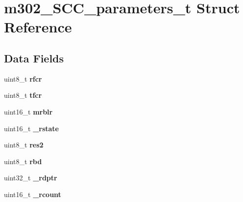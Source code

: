 \hypertarget{structm302__SCC__parameters__t}{}\section{m302\+\_\+\+S\+C\+C\+\_\+parameters\+\_\+t Struct Reference}
\label{structm302__SCC__parameters__t}
\subsection*{Data Fields}
\begin{DoxyCompactItemize}
\item 
\mbox{\label{structm302__SCC__parameters__t_a1f1cbb08cc304bc826678beb029a76e1}} 
uint8\+\_\+t {\bfseries rfcr}
\item 
\mbox{\label{structm302__SCC__parameters__t_a48c538c4596df61fd03851bae233ec4d}} 
uint8\+\_\+t {\bfseries tfcr}
\item 
\mbox{\label{structm302__SCC__parameters__t_a70bd6b673dd52012e63c11037865db8b}} 
uint16\+\_\+t {\bfseries mrblr}
\item 
\mbox{\label{structm302__SCC__parameters__t_ae9639ae7a73b149cf7e4139e6f2e3dfd}} 
uint16\+\_\+t {\bfseries \+\_\+rstate}
\item 
\mbox{\label{structm302__SCC__parameters__t_a8ee2e1e4a35d49bbaaf194c523fb6d11}} 
uint8\+\_\+t {\bfseries res2}
\item 
\mbox{\label{structm302__SCC__parameters__t_aadb4039faa9b89264cdec17c2941e491}} 
uint8\+\_\+t {\bfseries rbd}
\item 
\mbox{\label{structm302__SCC__parameters__t_a119fa1f72deaea6f0330fedf1bce341f}} 
uint32\+\_\+t {\bfseries \+\_\+rdptr}
\item 
\mbox{\label{structm302__SCC__parameters__t_a9b66e1cab65648cb7185f0cd0a3b4c3d}} 
uint16\+\_\+t {\bfseries \+\_\+rcount}
\item 
\mbox{\label{structm302__SCC__parameters__t_a1546530e350677e0d963fa8be6d1b34c}} 

\end{DoxyCompactItemize}

